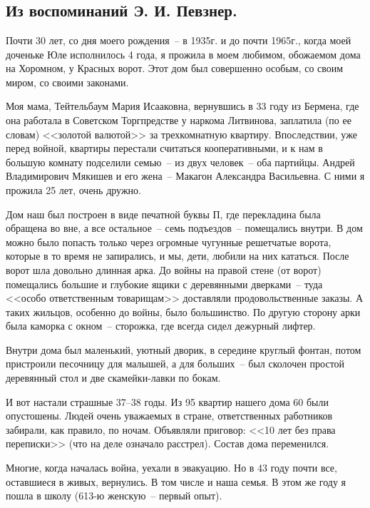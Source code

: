 \chapter{}

\section*{Из воспоминаний Э. И. Певзнер.}

Почти 30 лет, со дня моего рождения~-- в 1935г. и до почти 1965г., когда моей доченьке Юле исполнилось 4 года, я прожила в моем любимом, обожаемом дома на Хоромном, у Красных ворот. Этот дом был совершенно особым, со своим миром, со своими законами.

Моя мама, Тейтельбаум Мария Исааковна, вернувшись в 33 году из Бермена, где она работала в Советском Торгпредстве у наркома Литвинова, заплатила (по ее словам) <<золотой валютой>> за трехкомнатную квартиру. Впоследствии, уже перед войной, квартиры перестали считаться кооперативными, и к нам в большую комнату подселили семью~-- из двух человек~-- оба партийцы. Андрей Владимирович Мякишев и его жена~-- Макагон Александра Васильевна. С ними я прожила 25 лет, очень дружно.

Дом наш был построен в виде печатной буквы П, где перекладина была обращена во вне, а все остальное~-- семь подъездов~-- помещались внутри. В дом можно было попасть только через огромные чугунные решетчатые ворота, которые в то время не запирались, и мы, дети, любили на них кататься. После ворот шла довольно длинная арка. До войны на правой стене (от ворот) помещались большие и глубокие ящики с деревянными дверками~-- туда <<особо ответственным товарищам>> доставляли продовольственные заказы. А таких жильцов, особенно до войны, было большинство. По другую сторону арки была каморка с окном~-- сторожка, где всегда сидел дежурный лифтер.

Внутри дома был маленький, уютный дворик, в середине круглый фонтан, потом пристроили песочницу для малышей, а для больших~-- был сколочен простой деревянный стол и две скамейки-лавки по бокам.

И вот настали страшные 37--38 годы. Из 95 квартир нашего дома 60 были опустошены. Людей очень уважаемых в стране, ответственных работников забирали, как правило, по ночам. Объявляли приговор: <<10 лет без права переписки>> (что на деле означало расстрел). Состав дома переменился.

Многие, когда началась война, уехали в эвакуацию. Но в 43 году почти все, оставшиеся в живых, вернулись. В том числе и наша семья. В этом же году я пошла в школу (613-ю женскую~-- первый опыт).

